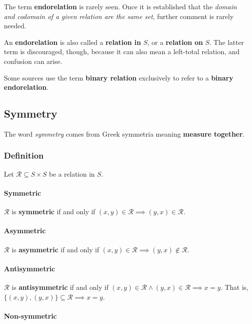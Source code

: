 The term \textbf{endorelation} is rarely seen. Once it is established
that the \textit{domain and codomain of a given relation are the same
  set}, further comment is rarely needed.


An \textbf{endorelation} is also called a \textbf{relation in} $S$, or
a \textbf{relation on} $S$. The latter term is discouraged, though,
because it can also mean a left-total relation, and confusion can
arise.

Some sources use the term \textbf{binary relation} exclusively to
refer to a \textbf{binary endorelation}.


\subsection{Symmetry}
\label{sec:symmetry}
The word \textit{symmetry} comes from Greek symmetria meaning
\textbf{measure together}.

\subsubsection{Definition}

Let $\mathcal{R} \subseteq S \times S$ be a relation in $S$.



\paragraph{Symmetric}

$\mathcal{R}$ is \textbf{symmetric} if and only if
$(x, y) \in \mathcal{R} \implies (y, x) \in \mathcal{R}$.

\paragraph{Asymmetric}

$\mathcal{R}$ is \textbf{asymmetric} if and only if
$(x, y) \in \mathcal{R} \implies (y, x) \notin \mathcal{R}$.

\paragraph{Antisymmetric}

$\mathcal{R}$ is \textbf{antisymmetric} if and only if
$ (x,y) \in \mathcal{R} \land (y, x) \in \mathcal{R} \implies x = y $.
That is, $\{(x, y), (y, x) \} \subseteq \mathcal{R} \implies x = y $.

\paragraph{Non-symmetric}

